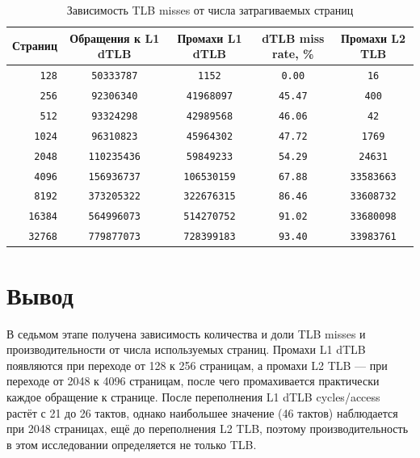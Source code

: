 \begin{table}[H]
\caption{Зависимость TLB misses от числа затрагиваемых страниц}
\label{tab:tlb-misses}
\small
\begin{tabularx}{\textwidth}{|r|C|C|C|C|}
	\hline
	Страниц & Обращения к L1 dTLB & Промахи L1 dTLB & dTLB miss rate, \% & Промахи L2 TLB \\
	\hline
	\texttt{128} & \texttt{50333787} & \texttt{1152} & \texttt{0.00} & \texttt{16} \\
	\hline
	\texttt{256} & \texttt{92306340} & \texttt{41968097} & \texttt{45.47} & \texttt{400} \\
	\hline
	\texttt{512} & \texttt{93324298} & \texttt{42989568} & \texttt{46.06} & \texttt{42} \\
	\hline
	\texttt{1024} & \texttt{96310823} & \texttt{45964302} & \texttt{47.72} & \texttt{1769} \\
	\hline
	\texttt{2048} & \texttt{110235436} & \texttt{59849233} & \texttt{54.29} & \texttt{24631} \\
	\hline
	\texttt{4096} & \texttt{156936737} & \texttt{106530159} & \texttt{67.88} & \texttt{33583663} \\
	\hline
	\texttt{8192} & \texttt{373205322} & \texttt{322676315} & \texttt{86.46} & \texttt{33608732} \\
	\hline
	\texttt{16384} & \texttt{564996073} & \texttt{514270752} & \texttt{91.02} & \texttt{33680098} \\
	\hline
	\texttt{32768} & \texttt{779877073} & \texttt{728399183} & \texttt{93.40} & \texttt{33983761} \\
	\hline
\end{tabularx}
\end{table}

\section{Вывод}

В седьмом этапе получена зависимость количества и доли TLB misses и производительности от числа используемых страниц.
Промахи L1 dTLB появляются при переходе от 128 к 256 страницам, а промахи L2 TLB --- при переходе от 2048 к 4096 страницам, после чего промахивается практически каждое обращение к странице.
После переполнения L1 dTLB cycles/access растёт с 21 до 26 тактов, однако наибольшее значение (46 тактов) наблюдается при 2048 страницах, ещё до переполнения L2 TLB, поэтому производительность в этом исследовании определяется не только TLB.

